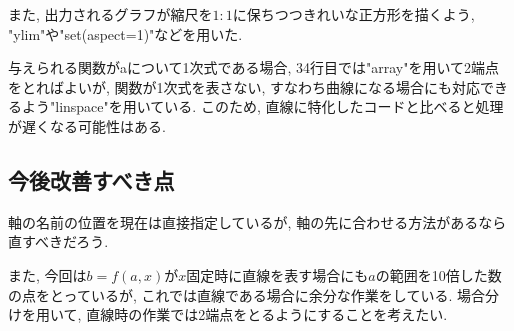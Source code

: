 \documentclass[11pt,a4j,fleqn]{jarticle}
\begin{document}
また, 出力されるグラフが縮尺を$1:1$に保ちつつきれいな正方形を描くよう, "ylim"や"set(aspect=1)"などを用いた.

与えられる関数がaについて1次式である場合, 34行目では"array"を用いて2端点をとればよいが, 関数が1次式を表さない, 
すなわち曲線になる場合にも対応できるよう"linspace"を用いている. このため, 直線に特化したコードと比べると処理が遅くなる可能性はある.

\subsection{今後改善すべき点}
軸の名前の位置を現在は直接指定しているが, 軸の先に合わせる方法があるなら直すべきだろう.

また, 今回は$b=f(a,x)$が$x$固定時に直線を表す場合にも$a$の範囲を10倍した数の点をとっているが, これでは直線である場合に余分な作業をしている. 
場合分けを用いて, 直線時の作業では2端点をとるようにすることを考えたい.\\


\begin{thebibliography}{0}
\bibitem{}

\end{thebibliography}
\end{document}

